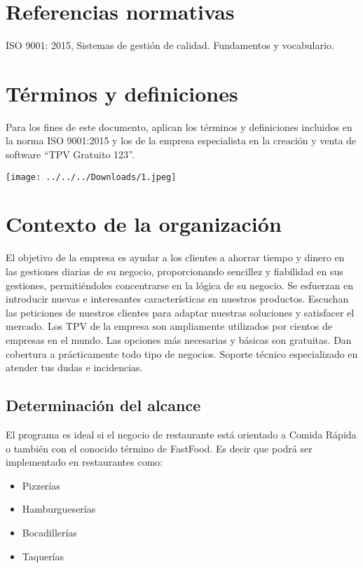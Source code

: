 \documentclass[12pt,a4paper]{article}
\begin{document}
\section{Referencias normativas}
ISO 9001: 2015, Sistemas de gestión de calidad. Fundamentos y vocabulario.

\section{Términos y definiciones}
Para los fines de este documento, aplican los términos y definiciones incluidos en la norma ISO 9001:2015 y los de la empresa especialista en la creación y venta de software “TPV Gratuito 123”.
\begin{center}
\texttt{[image: ../../../Downloads/1.jpeg]}  
\end{center}

\section{Contexto de la organización}
El objetivo de la empresa es ayudar a los clientes a ahorrar tiempo y dinero en las gestiones diarias de su negocio, proporcionando sencillez y fiabilidad en sus gestiones, permitiéndoles concentrarse en la lógica de su negocio.
Se esfuerzan en introducir nuevas e interesantes características en nuestros productos.
Escuchan las peticiones de nuestros clientes para adaptar nuestras soluciones y satisfacer el mercado.
 Los TPV de la empresa son ampliamente utilizados por cientos de empresas en el mundo.
 Las opciones más necesarias y básicas son gratuitas.
 Dan cobertura a prácticamente todo tipo de negocios.
 Soporte técnico especializado en atender tus dudas e incidencias.
 
\subsection{Determinación del alcance}
El programa es ideal si el negocio de restaurante está orientado a Comida Rápida o también con el conocido término de FastFood. Es decir que podrá ser implementado en restaurantes como:
\begin{itemize}
\item Pizzerías
\item Hamburgueserías
\item Bocadillerías
\item Taquerías\\\\
\end{itemize}
\end{document}

